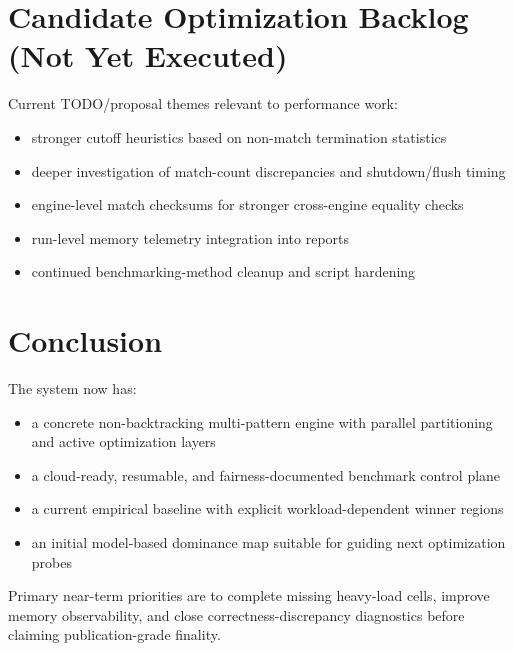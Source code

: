 \documentclass[11pt]{article}
\begin{document}
\section{Candidate Optimization Backlog (Not Yet Executed)}
Current TODO/proposal themes relevant to performance work:
\begin{itemize}
  \item stronger cutoff heuristics based on non-match termination statistics
  \item deeper investigation of match-count discrepancies and shutdown/flush timing
  \item engine-level match checksums for stronger cross-engine equality checks
  \item run-level memory telemetry integration into reports
  \item continued benchmarking-method cleanup and script hardening
\end{itemize}

\section{Conclusion}
The system now has:
\begin{itemize}
  \item a concrete non-backtracking multi-pattern engine with parallel partitioning and active optimization layers
  \item a cloud-ready, resumable, and fairness-documented benchmark control plane
  \item a current empirical baseline with explicit workload-dependent winner regions
  \item an initial model-based dominance map suitable for guiding next optimization probes
\end{itemize}

Primary near-term priorities are to complete missing heavy-load cells, improve memory observability, and close correctness-discrepancy diagnostics before claiming publication-grade finality.
\end{document}
